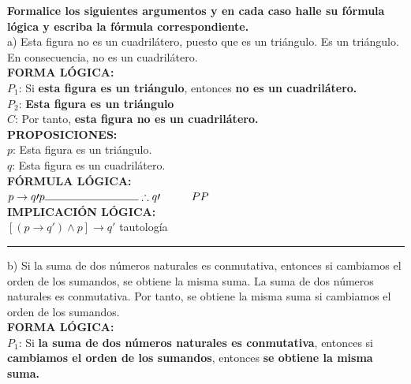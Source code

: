 \documentclass[letterpaper,12pt]{article}
\begin{document}
\begin{sloppypar}
\hspace{1 cm}\textbf{Formalice los siguientes argumentos y en cada caso halle su fórmula lógica y escriba la fórmula correspondiente.}
\vspace{0.7cm} \\ 
a) Esta figura no es un cuadrilátero, puesto que es un triángulo. Es un triángulo. En consecuencia, no es un
cuadrilátero.
\vspace{0.3cm} \\ 
\textbf{FORMA LÓGICA:} \\ 
$P_1$: Si \textcolor[rgb]{1,0,0}{\textbf{esta figura es un triángulo}}, entonces \textcolor[rgb]{0.2,0.5,0.7}{\textbf{no es un cuadrilátero.}}\\ 
$P_2$: \textcolor[rgb]{1,0,0}{\textbf{Esta figura es un triángulo}} \\ 
$C$: Por tanto, \textcolor[rgb]{0.2,0.5,0.7}{\textbf{esta figura no es un cuadrilátero.}}
\vspace{0.3cm}\\ 
\textbf{PROPOSICIONES:}\\ 
$p$: Esta figura es un triángulo. \\
$q$: Esta figura es un cuadrilátero.
\vspace{0.3cm}\\ 
\textbf{FÓRMULA LÓGICA:} \\ 
$p \rightarrow q\prime \\ p \\ \noindent\rule{3cm}{0.4pt}  \\ \therefore q\prime \hspace{1cm} PP$
\vspace{0.3cm}\\ 
\textbf{IMPLICACIÓN LÓGICA:} \\ 
$[(p \rightarrow q\prime) \wedge p] \rightarrow q\prime$ tautología 
\vspace{0.3cm} 
\hrule 
\vspace{0.3cm} 
b) Si la suma de dos números naturales es conmutativa, entonces si cambiamos el orden de los sumandos, se obtiene la misma suma. La suma de dos números naturales es conmutativa. Por tanto, se obtiene la misma suma si cambiamos el orden de los sumandos.
\vspace{0.3cm} \\ 
\textbf{FORMA LÓGICA:} \\ 
$P_1$: Si \textcolor[rgb]{1,0,0}{\textbf{la suma de dos números naturales es conmutativa}}, entonces si \textcolor[rgb]{0.2,0.5,0.7}{\textbf{cambiamos el orden de los sumandos}}, entonces \textcolor[rgb]{0.2,0.7,0.5}{\textbf{se obtiene la misma suma.}} \\ 

\end{sloppypar}
\end{document}
